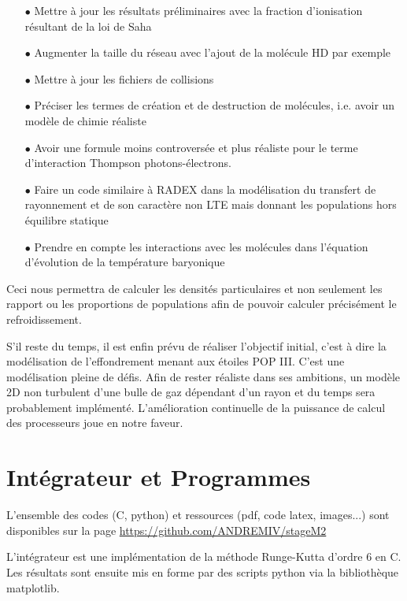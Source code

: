 \documentclass[10pt, a4paper]{report}
\numberwithin{equation}{subsection}
\begin{document}
\begin{itemize}
	\item [$\bullet$] Mettre à jour les résultats préliminaires avec la fraction d'ionisation résultant de la loi de Saha
	\item [$\bullet$] Augmenter la taille du réseau avec l'ajout de la molécule HD par exemple
	\item [$\bullet$] Mettre à jour les fichiers de collisions
	\item [$\bullet$] Préciser les termes de création et de destruction de molécules, i.e. avoir un modèle de chimie réaliste
	\item [$\bullet$] Avoir une formule moins controversée et plus réaliste pour le terme d'interaction Thompson photons-électrons. 
	\item [$\bullet$] Faire un code similaire à RADEX dans la modélisation du transfert de rayonnement et de son caractère non LTE mais donnant les populations hors équilibre statique
	\item [$\bullet$] Prendre en compte les interactions avec les molécules dans l'équation d'évolution de la température baryonique 
\end{itemize}

Ceci nous permettra de calculer les densités particulaires et non seulement les rapport ou les proportions de populations afin de pouvoir calculer précisément le refroidissement.

S'il reste du temps, il est enfin prévu de réaliser l'objectif initial, c'est à dire la modélisation de l'effondrement menant aux étoiles POP III. C'est une modélisation pleine de défis. Afin de rester réaliste dans ses ambitions, un modèle 2D non turbulent d'une bulle de gaz dépendant d'un rayon et du temps sera probablement implémenté. L'amélioration continuelle de la puissance de calcul des processeurs joue en notre faveur. 

\appendix

\chapter{Intégrateur et Programmes}
L'ensemble des codes (C, python) et ressources (pdf, code latex, images...) sont disponibles sur la page \url{https://github.com/ANDREMIV/stageM2}

L'intégrateur est une implémentation de la méthode Runge-Kutta d'ordre 6 en C. Les résultats sont ensuite mis en forme par des scripts python via la bibliothèque matplotlib. 
\end{document}
